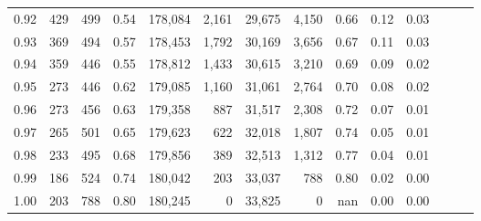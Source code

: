 \begin{tabular}{rrrrrrrrrrrrrr}
0.92 &    429 &  499 &  0.54 &  178,084 &    2,161 &  29,675 &   4,150 &  0.66 &  0.12 &      0.03 \\
0.93 &    369 &  494 &  0.57 &  178,453 &    1,792 &  30,169 &   3,656 &  0.67 &  0.11 &      0.03 \\
0.94 &    359 &  446 &  0.55 &  178,812 &    1,433 &  30,615 &   3,210 &  0.69 &  0.09 &      0.02 \\
0.95 &    273 &  446 &  0.62 &  179,085 &    1,160 &  31,061 &   2,764 &  0.70 &  0.08 &      0.02 \\
0.96 &    273 &  456 &  0.63 &  179,358 &      887 &  31,517 &   2,308 &  0.72 &  0.07 &      0.01 \\
0.97 &    265 &  501 &  0.65 &  179,623 &      622 &  32,018 &   1,807 &  0.74 &  0.05 &      0.01 \\
0.98 &    233 &  495 &  0.68 &  179,856 &      389 &  32,513 &   1,312 &  0.77 &  0.04 &      0.01 \\
0.99 &    186 &  524 &  0.74 &  180,042 &      203 &  33,037 &     788 &  0.80 &  0.02 &      0.00 \\
1.00 &    203 &  788 &  0.80 &  180,245 &        0 &  33,825 &       0 &   nan &  0.00 &      0.00 \\
\bottomrule
\end{tabular}
